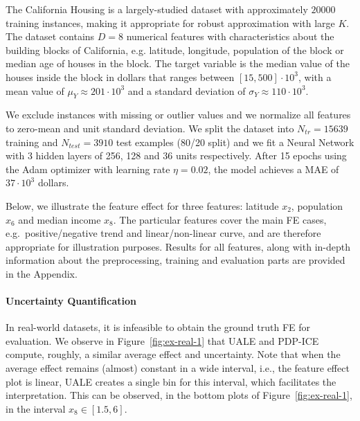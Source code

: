 \documentclass[twoside]{article}
\begin{document}
The California Housing is a largely-studied dataset with approximately
\(20000\) training instances, making it appropriate for robust
approximation with large \(K\). The dataset contains \(D=8\) numerical
features with characteristics about the building blocks of California,
e.g. latitude, longitude, population of the block or median age of
houses in the block. The target variable is the median value of the
houses inside the block in dollars that ranges between
\([15, 500] \cdot 10^3\), with a mean value of
\(\mu_Y \approx 201 \cdot 10^3 \) and a standard deviation of
\(\sigma_Y \approx 110 \cdot 10^3\).

We exclude instances with missing or outlier values and we normalize
all features to zero-mean and unit standard deviation. We split the
dataset into \(N_{tr} = 15639\) training and \(N_{test} = 3910\) test
examples (80/20 split) and we fit a Neural Network with 3 hidden
layers of 256, 128 and 36 units respectively. After 15 epochs using
the Adam optimizer with learning rate \(\eta = 0.02\), the model
achieves a MAE of \(37 \cdot 10^3\) dollars.

Below, we illustrate the feature effect for three features: latitude
\(x_2\), population \(x_6\) and median income \(x_8\). The particular
features cover the main FE cases, e.g.~positive/negative trend and
linear/non-linear curve, and are therefore appropriate for
illustration purposes. Results for all features, along with in-depth
information about the preprocessing, training and evaluation parts are
provided in the Appendix.

\paragraph{Uncertainty Quantification}

In real-world datasets, it is infeasible to obtain the ground truth FE
for evaluation. We observe in Figure~\ref{fig:ex-real-1} that UALE and
PDP-ICE compute, roughly, a similar average effect and
uncertainty. Note that when the average effect remains (almost)
constant in a wide interval, i.e., the feature effect plot is linear,
UALE creates a single bin for this interval, which facilitates the
interpretation. This can be observed, in the bottom plots of
Figure~\ref{fig:ex-real-1}, in the interval \(x_8 \in [1.5, 6]\).
\end{document}
